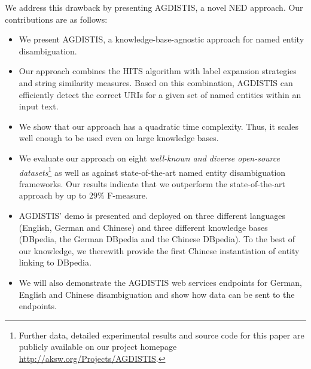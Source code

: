 We address this drawback by presenting AGDISTIS,  a novel \ac{NED} approach. Our contributions are as follows:
\begin{itemize}
\item We present AGDISTIS, a knowledge-base-agnostic approach for named entity disambiguation.
\item Our approach combines the \ac{HITS} algorithm with label expansion strategies and string similarity measures.
Based on this combination, AGDISTIS can efficiently detect the correct URIs for a given set of named entities within an input text. 
\item We show that our approach has a quadratic time complexity. Thus, it scales well enough to be used even on large knowledge bases.
\item We evaluate our approach on eight \emph{well-known and diverse open-source datasets}\footnote{Further data, detailed experimental results and source code for this paper are publicly available on our project homepage \url{http://aksw.org/Projects/AGDISTIS}.} as well as against state-of-the-art named entity disambiguation frameworks.
Our results indicate that we outperform the state-of-the-art approach by up to $29\%$ F-measure.
\item AGDISTIS' demo is presented and deployed on three different languages (English, German and Chinese) and three different knowledge bases (DBpedia, the German DBpedia and the Chinese DBpedia).
To the best of our knowledge, we therewith provide the first Chinese instantiation of entity linking to DBpedia.
\item We will also demonstrate the AGDISTIS web services endpoints for German, English and Chinese disambiguation and show how data can be sent to the endpoints.
\end{itemize}


